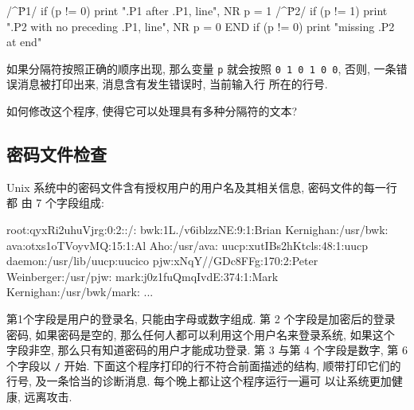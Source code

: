 \begin{shell}
\begin{awkcode}
    /^\.P1/ { if (p != 0)
                  print ".P1 after .P1, line", NR
              p = 1
            }
    /^\.P2/ { if (p != 1)
                  print ".P2 with no preceding .P1, line", NR
              p = 0
            }
    END     { if (p != 0) print "missing .P2 at end" }
\end{awkcode}
如果分隔符按照正确的顺序出现, 那么变量 \verb'p' 就会按照 \texttt{0 1 0 1 0
 0}, 否则, 一条错误消息被打印出来, 消息含有发生错误时, 当前输入行
所在的行号.

\begin{exercise}
    如何修改这个程序, 使得它可以处理具有多种分隔符的文本?
\end{exercise}

\subsection{密码文件检查}
\label{subsec:password_file checking}

Unix 系统中的密码文件含有授权用户的用户名及其相关信息, 密码文件的每一行都
由 7 个字段组成:
\begin{awkcode}
    root:qyxRi2uhuVjrg:0:2::/:
    bwk:1L./v6iblzzNE:9:1:Brian Kernighan:/usr/bwk:
    ava:otxs1oTVoyvMQ:15:1:Al Aho:/usr/ava:
    uucp:xutIBs2hKtcls:48:1:uucp daemon:/usr/lib/uucp:uucico
    pjw:xNqY//GDc8FFg:170:2:Peter Weinberger:/usr/pjw:
    mark:j0z1fuQmqIvdE:374:1:Mark Kernighan:/usr/bwk/mark:
    ...
\end{awkcode}
第1个字段是用户的登录名, 只能由字母或数字组成. 第 2 个字段是加密后的登录
密码, 如果密码是空的, 那么任何人都可以利用这个用户名来登录系统, 如果这个
字段非空, 那么只有知道密码的用户才能成功登录. 第 3 与第 4 个字段是数字,
第 6 个字段以 \verb'/' 开始. 下面这个程序打印的行不符合前面描述的结构,
顺带打印它们的行号, 及一条恰当的诊断消息. 每个晚上都让这个程序运行一遍可
以让系统更加健康, 远离攻击.


\end{shell}
